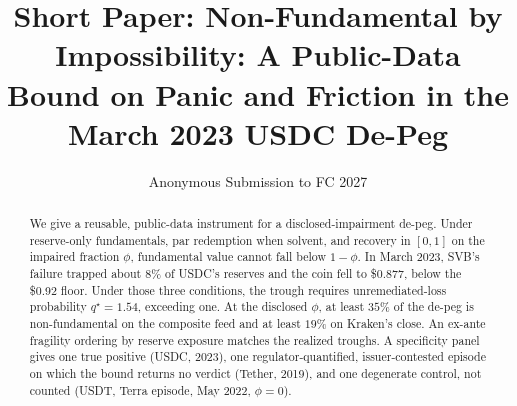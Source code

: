 \title{Short Paper: Non-Fundamental by Impossibility: A Public-Data Bound on Panic
and Friction in the March 2023 USDC De-Peg}
\author{Anonymous Submission to FC 2027}
\institute{}

\maketitle

\begin{abstract}
We give a reusable, public-data instrument for a disclosed-impairment de-peg.
Under reserve-only fundamentals, par redemption when solvent, and recovery in
$[0,1]$ on the impaired fraction $\phi$, fundamental value cannot fall below
$1-\phi$. In March 2023, SVB's failure trapped about $8\%$ of USDC's reserves
and the coin fell to \$0.877, below the \$0.92 floor. Under those three conditions,
the trough requires unremediated-loss probability $q^{\star}=1.54$, exceeding one.
At the disclosed $\phi$, at least $35\%$ of the de-peg is non-fundamental on
the composite feed and at least $19\%$ on Kraken's close. An ex-ante fragility
ordering by reserve exposure matches the realized troughs. A specificity panel
gives one true positive (USDC, 2023), one regulator-quantified, issuer-contested
episode on which the bound returns no verdict (Tether, 2019), and one
degenerate control, not counted (USDT, Terra episode, May 2022, $\phi=0$).

\end{abstract}
